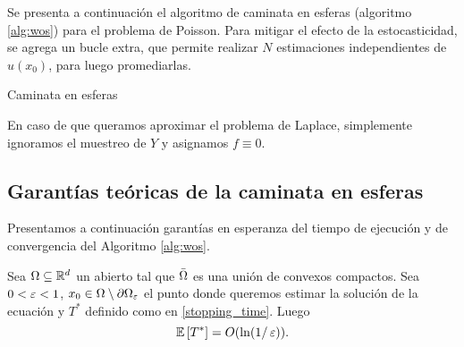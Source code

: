 Se presenta a continuación el algoritmo de caminata en esferas (algoritmo \ref{alg:wos}) para el problema de Poisson. Para mitigar el efecto de la estocasticidad, se agrega un bucle extra, que permite realizar $N$ estimaciones independientes de $u(x_0)$, para luego promediarlas.

\begin{algorithm}[H]\label{alg:wos}
\caption{Caminata en esferas}
\end{algorithm}

En caso de que queramos aproximar el problema de Laplace, simplemente ignoramos el muestreo de $Y$ y asignamos $f\equiv 0$.

\subsection{Garantías teóricas de la caminata en esferas}

Presentamos a continuación garantías en esperanza del tiempo de ejecución y de convergencia del Algoritmo \ref{alg:wos}.

\begin{theorem}\citep{delaurentis1990monte}\label{thm:stopping_time_guarantee}
    Sea $\Omega\subseteq\mathbb{R}^d$ un abierto tal que $\Bar{\Omega}$ es una unión de convexos compactos. Sea $0<\operatorname{\varepsilon}<1$, $x_0\in\Omega\setminus \partial\Omega_{\operatorname{\varepsilon}}$ el punto donde queremos estimar la solución de la ecuación y $T^{\ast}$ definido como en \eqref{stopping_time}. Luego
    \begin{equation*}
        \mathbb{E}\left[T^{\ast}\right]=O(\ln(1/\operatorname{\varepsilon})).
    \end{equation*}
\end{theorem}

